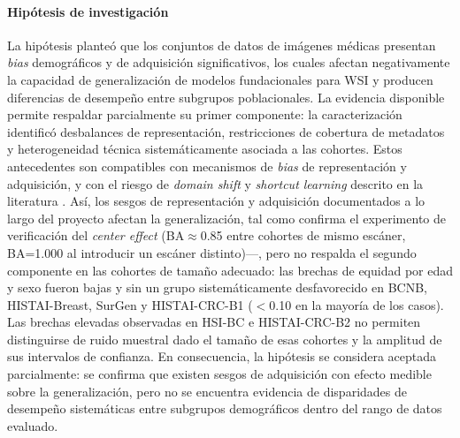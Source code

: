 \paragraph{Hipótesis de investigación} La hipótesis planteó que los conjuntos de datos de imágenes médicas presentan \textit{bias} demográficos y de adquisición significativos, los cuales afectan negativamente la capacidad de generalización de modelos fundacionales para WSI y producen diferencias de desempeño entre subgrupos poblacionales. La evidencia disponible permite respaldar parcialmente su primer componente: la caracterización identificó desbalances de representación, restricciones de cobertura de metadatos y heterogeneidad técnica sistemáticamente asociada a las cohortes. Estos antecedentes son compatibles con mecanismos de \textit{bias} de representación y adquisición, y con el riesgo de \textit{domain shift} y \textit{shortcut learning} descrito en la literatura \parencite{suresh2021framework,mehrabi2021survey,geirhos2020shortcut,stacke2021domainshift}. Así, los sesgos de representación y adquisición documentados a lo largo del proyecto afectan la generalización, tal como confirma el experimento de verificación del \textit{center effect} (BA$\approx$0.85 entre cohortes de mismo escáner, BA=1.000 al introducir un escáner distinto)—, pero no respalda el segundo componente en las cohortes de tamaño adecuado: las brechas de equidad por edad y sexo fueron bajas y sin un grupo sistemáticamente desfavorecido en BCNB, HISTAI-Breast, SurGen y HISTAI-CRC-B1 ($<$0.10 en la mayoría de los casos). Las brechas elevadas observadas en HSI-BC e HISTAI-CRC-B2 no permiten distinguirse de ruido muestral dado el tamaño de esas cohortes y la amplitud de sus intervalos de confianza. En consecuencia, la hipótesis se considera aceptada parcialmente: se confirma que existen sesgos de adquisición con efecto medible sobre la generalización, pero no se encuentra evidencia de disparidades de desempeño sistemáticas entre subgrupos demográficos dentro del rango de datos evaluado.



